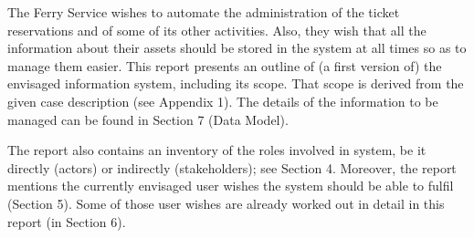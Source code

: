 The Ferry Service wishes to automate the administration of the ticket reservations and of some of its other activities. Also, they wish that all the information about their assets should be stored in the system at all times so as to manage them easier. This report presents an outline of (a first version of) the envisaged information system, including its scope. That scope is derived from the given case description (see Appendix 1). The details of the information to be managed can be found in Section 7 (Data Model).

The report also contains an inventory of the roles involved in system, be it directly (actors) or indirectly (stakeholders); see Section 4. Moreover, the report mentions the currently envisaged user wishes the system should be able to fulfil (Section 5). Some of those user wishes are already worked out in detail in this report (in Section 6).